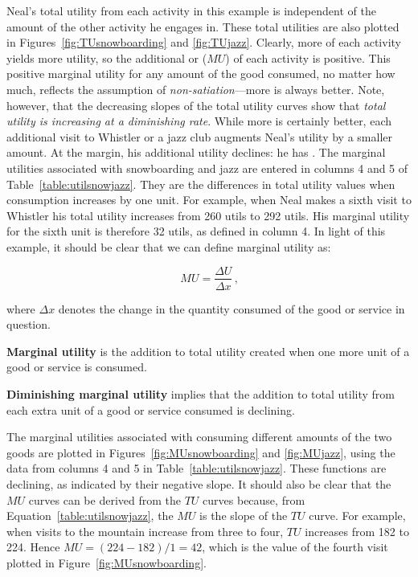 Neal's total utility from each activity in this example is independent of the amount of the other activity he engages in. These total utilities are also plotted in Figures~\ref{fig:TUsnowboarding} and \ref{fig:TUjazz}. Clearly, more of each activity yields more utility, so the additional or  ($MU$) of each activity is positive. This positive marginal utility for any amount of the good consumed, no matter how much, reflects the assumption of \textit{non-satiation}---more is always better. Note, however, that the decreasing slopes of the total utility curves show that \textit{total utility is increasing at a diminishing rate}. While more is certainly better, each additional visit to Whistler or a jazz club augments Neal's utility by a smaller amount. At the margin, his additional utility declines: he has . The marginal utilities associated with snowboarding and jazz are entered in columns 4 and 5 of Table~\ref{table:utilsnowjazz}. They are the differences in total utility values when consumption increases by one unit. For example, when Neal makes a sixth visit to Whistler his total utility increases from 260 utils to 292 utils. His marginal utility for the sixth unit is therefore 32 utils, as defined in column 4. In light of this example, it should be clear that we can define marginal utility as:

\begin{equation} \label{eq:marginalutility}
MU=\frac{\Delta U}{\Delta x}\,\text{,}
\end{equation}

where $\Delta x$ denotes the change in the quantity consumed of the good or service in question.

\begin{DefBox}
\textbf{Marginal utility} is the addition to total utility created when one more unit of a good or service is consumed.

\textbf{Diminishing marginal utility} implies that the addition to total utility from each extra unit of a good or service consumed is declining.
\end{DefBox}





The marginal utilities associated with consuming different amounts of the two goods are plotted in Figures~\ref{fig:MUsnowboarding} and \ref{fig:MUjazz}, using the data from columns 4 and 5 in Table~\ref{table:utilsnowjazz}. These functions are declining, as indicated by their negative slope. It should also be clear that the $MU$ curves can be derived from the $TU$ curves because, from Equation~\ref{table:utilsnowjazz}, the $MU$ is the slope of the $TU$ curve. For example, when visits to the mountain increase from three to four, $TU$ increases from 182 to 224. Hence $MU=(224-182)/1=42$, which is the value of the fourth visit plotted in Figure~\ref{fig:MUsnowboarding}.

